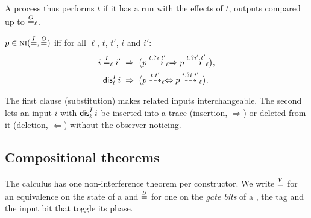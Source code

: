 A process thus performs $t$ if it has a run with the effects of $t$, outputs
compared up to $\overset{O}{=}_\ell$.

\begin{definition}\label{def:ni}
$p \in \text{\normalfont\scshape ni}(\overset{I}{=}, \overset{O}{=})$ iff for all $\ell$, $t$, $t'$, $i$ and $i'$:
\begin{align*}
i \overset{I}{=}_\ell i' &\;\Rightarrow\; \bigl(p \overset{t.?i.t'}{\dashrightarrow}_{\ell} \Rightarrow
  p \overset{t.?i'.t'}{\dashrightarrow}_{\ell}\bigr), \\
\mathsf{dis}^I_\ell\,i &\;\Rightarrow\; \bigl(p \overset{t.t'}{\dashrightarrow}_{\ell} \Leftrightarrow
  p \overset{t.?i.t'}{\dashrightarrow}_{\ell}\bigr).
\end{align*}
\end{definition}

The first clause (substitution) makes related inputs interchangeable. The second
lets an input $i$ with $\mathsf{dis}^I_\ell\,i$ be inserted into a trace (insertion,
$\Rightarrow$) or deleted from it (deletion, $\Leftarrow$) without the observer
noticing.

\subsection{Compositional theorems}\label{sec:composition}

The calculus has one non-interference theorem per constructor. We write
$\overset{V}{=}$ for an equivalence on the state of a  and $\overset{B}{=}$ for one on the
\emph{gate bits} of a , the tag and the input bit that toggle its phase.

